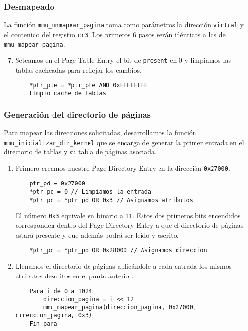 \subsubsection*{Desmapeado}

La función \texttt{mmu\_unmapear\_pagina} toma como parámetros la dirección
\texttt{virtual} y el contenido del registro \texttt{cr3}. Los primeros 6 pasos
serán idénticos a los de \texttt{mmu\_mapear\_pagina}.

\begin{enumerate}
	\setcounter{enumi}{6}
	\item Seteamos en el Page Table Entry el bit de \texttt{present} en 0 y
		limpiamos las tablas cacheadas para reflejar los cambios.
	\begin{lstlisting}
	*ptr_pte = *ptr_pte AND 0xFFFFFFFE
	Limpio cache de tablas
	\end{lstlisting}
\end{enumerate}

\subsubsection{Generación del directorio de páginas}

Para mapear las direcciones solicitadas, desarrollamos la función
\texttt{mmu\_inicializar\_dir\_kernel} que se encarga de generar la primer
entrada en el directorio de tablas y su tabla de páginas asociada.

\begin{enumerate}
	\item Primero creamos nuestro Page Directory Entry en la dirección
		\texttt{0x27000}.
	\begin{lstlisting}
	ptr_pd = 0x27000
	*ptr_pd = 0 // Limpiamos la entrada
	*ptr_pd = *ptr_pd OR 0x3 // Asignamos atributos
	\end{lstlisting}
	El número \texttt{0x3} equivale en binario a \texttt{11}. Estos dos primeros
	bits encendidos corresponden dentro del Page Directory Entry a que el
	directorio de páginas estará presente y que además podrá ser leído y
	escrito.
	\begin{lstlisting}
	*ptr_pd = *ptr_pd OR 0x28000 // Asignamos direccion
	\end{lstlisting}

	\item Llenamos el directorio de páginas aplicándole a cada entrada los
		mismos atributos descritos en el punto anterior.
	\begin{lstlisting}
	Para i de 0 a 1024
		direccion_pagina = i << 12
		mmu_mapear_pagina(direccion_pagina, 0x27000, direccion_pagina, 0x3)
	Fin para
	\end{lstlisting}
\end{enumerate}

